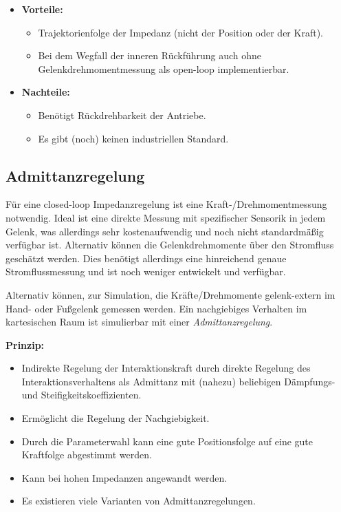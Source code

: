 			\begin{itemize}
				\item \textbf{Vorteile:}
					\begin{itemize}
						\item Trajektorienfolge der Impedanz (nicht der Position oder der Kraft).
						\item Bei dem Wegfall der inneren Rückführung auch ohne Gelenkdrehmomentmessung als open-loop implementierbar.
					\end{itemize}
				\item \textbf{Nachteile:}
					\begin{itemize}
						\item Benötigt Rückdrehbarkeit der Antriebe.
						\item Es gibt (noch) keinen industriellen Standard.
					\end{itemize}
			\end{itemize}

		\subsection{Admittanzregelung}
			Für eine closed-loop Impedanzregelung ist eine Kraft-/Drehmomentmessung notwendig. Ideal ist eine direkte Messung mit spezifischer Sensorik in jedem Gelenk, was allerdings sehr kostenaufwendig und noch nicht standardmäßig verfügbar ist. Alternativ können die Gelenkdrehmomente über den Stromfluss geschätzt werden. Dies benötigt allerdings eine hinreichend genaue Stromflussmessung und ist noch weniger entwickelt und verfügbar.
			
			Alternativ können, zur Simulation, die Kräfte/Drehmomente gelenk-extern im Hand- oder Fußgelenk gemessen werden. Ein nachgiebiges Verhalten im kartesischen Raum ist simulierbar mit einer \emph{Admittanzregelung}.
			
			\textbf{Prinzip:}
			\begin{itemize}
				\item Indirekte Regelung der Interaktionskraft durch direkte Regelung des Interaktionsverhaltens als Admittanz mit (nahezu) beliebigen Dämpfungs- und Steifigkeitskoeffizienten.
				\item Ermöglicht die Regelung der Nachgiebigkeit.
				\item Durch die Parameterwahl kann eine gute Positionsfolge auf eine gute Kraftfolge abgestimmt werden.
				\item Kann bei hohen Impedanzen angewandt werden.
				\item Es existieren viele Varianten von Admittanzregelungen.
			\end{itemize}
		
